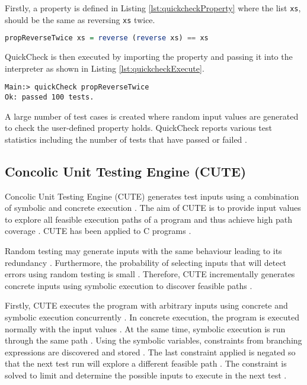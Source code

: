 Firstly, a property is defined in Listing \ref{lst:quickcheckProperty} where the list \texttt{xs}, should be the same as reversing \texttt{xs} twice.

\begin{lstlisting}[language=haskell, label={lst:quickcheckProperty},
caption={Property for reversing a list in QuickCheck}, captionpos=b, frame = single]
propReverseTwice xs = reverse (reverse xs) == xs
\end{lstlisting}

QuickCheck is then executed by importing the property and passing it into the interpreter as shown in Listing \ref{lst:quickcheckExecute}.

\begin{lstlisting}[label={lst:quickcheckExecute}, caption={Executing tests to check a list is reversed}, captionpos=b,
frame = single]
Main:> quickCheck propReverseTwice
Ok: passed 100 tests.
\end{lstlisting}

A large number of test cases is created where random input values are generated to check the user-defined property holds. QuickCheck reports various test statistics including the number of tests that have passed or failed \cite{QClightweight}.

\subsection{Concolic Unit Testing Engine (CUTE)}
Concolic Unit Testing Engine (CUTE) generates test inputs using a combination of symbolic and concrete execution \cite{CUTE}. 
The aim of CUTE is to provide input values to explore all feasible execution paths of a program and thus achieve high path coverage \cite{CUTE}. CUTE has been applied to C programs \cite{CUTE}.

Random testing may generate inputs with the same behaviour leading to its redundancy \cite{CUTE}. Furthermore, the probability of selecting inputs that will detect errors using random testing is small \cite{CUTE}. 
Therefore, CUTE incrementally generates concrete inputs using symbolic execution to discover feasible paths \cite{CUTE}.

Firstly, CUTE executes the program with arbitrary inputs using concrete and symbolic execution concurrently \cite{CUTE}.
In concrete execution, the program is executed normally with the input values \cite{CUTE}.
At the same time, symbolic execution is run through the same path  \cite{CUTE}. 
Using the symbolic variables, constraints from branching expressions are discovered and stored \cite{CUTE}.
The last constraint applied is negated so that the next test run will explore a different feasible path \cite{CUTE}. 
The constraint is solved to limit and determine the possible inputs to execute in the next test \cite{CUTE}.

